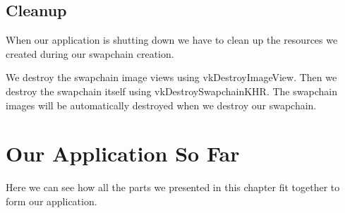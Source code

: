 \subsection{Cleanup}

When our application is shutting down we have to clean up the resources we
created during our swapchain creation.

We destroy the swapchain image views using vkDestroyImageView.
Then we destroy the swapchain itself using vkDestroySwapchainKHR.
The swapchain images will be automatically destroyed when we destroy our
swapchain.

\section{Our Application So Far}

Here we can see how all the parts we presented in this chapter fit together
to form our application.

\begin{minipage}{\linewidth}{\noindent}
    
\end{minipage}
